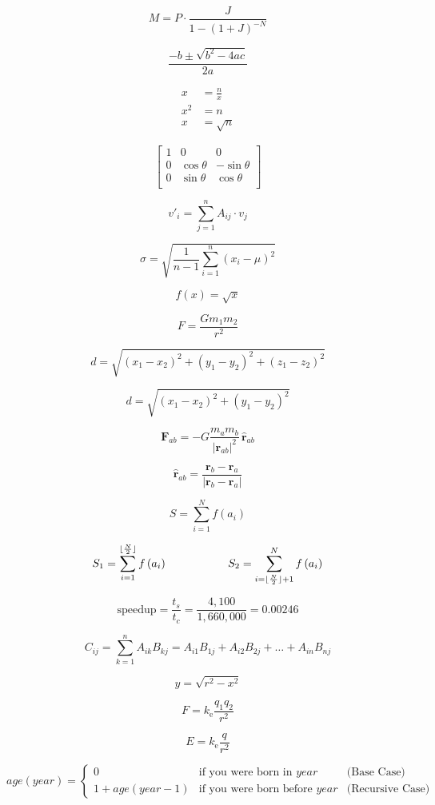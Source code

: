 \documentclass[12pt]{article}
\begin{document}
$$
M = P \cdot \frac{J}{1 - (1 + J)^{-N}}
$$

$$
\frac{-b \pm \sqrt{b^2 - 4ac}}{2a}
$$


\begin{align*}
x &= \frac{n}{x} \\
x^2 &= n \\
x &= \sqrt{n}
\end{align*}

$$
\begin{bmatrix}
1 & 0 & 0 \\
0 & \cos \theta & -\sin \theta \\
0 & \sin \theta  & \cos \theta \\
\end{bmatrix}
$$

$$
v'_i = \sum_{j = 1}^n A_{ij}\cdot v_j
$$

$$
\sigma = \sqrt{\frac{1}{n - 1}\sum_{i = 1}^n (x_i - \mu)^2}
$$

$$
f(x) = \sqrt{x}
$$

$$
F = \frac{Gm_1m_2}{r^2}
$$

$$
d = \sqrt{(x_1 - x_2)^2 + (y_1 - y_2)^2 + (z_1 -  z_2)^2}
$$

$$
d = \sqrt{(x_1 - x_2)^2+(y_1 - y_2)^2}
$$

$$
\mathbf{F}_{ab} = - G \frac{m_a m_b}{{\vert \mathbf{r}_{ab} \vert}^2} \, \mathbf{\hat{r}}_{ab}
$$

$$
\mathbf{\hat{r}}_{ab} = \frac{\mathbf{r}_b - \mathbf{r}_a}{\vert\mathbf{r}_b - \mathbf{r}_a\vert}
$$

$$
S = \sum_{i=1}^N f\left(a_i\right)
$$

$$
S_1 = \sum_{i=1}^{\lfloor \frac{N}{2}\rfloor } f\left(a_i\right)\hspace{.75in}
S_2 = \sum_{i=\lfloor \frac{N}{2} \rfloor +1}^{N} f\left(a_i\right)
$$

$$
\mbox{speedup}=\frac{t_s}{t_c} = \frac{4,100}{1,660,000} = 0.00246
$$

$$
C_{ij} = \sum_{k = 1}^n A_{ik}B_{kj} = A_{i1}B_{1j} + A_{i2}B_{2j} + \ldots + A_{in}B_{nj}
$$

$$
y = \sqrt{r^2 - x^2}
$$

$$
F = k_\mathrm{e} \frac{q_1q_2}{r^2}
$$

$$
E = k_\mathrm{e} \frac{q}{r^2}
$$

$$
age(year) =
\left\{\begin{array}{lll}
0 & \text{if you were born in $year$} &  \text{(Base Case)} \\
1 + age(year-1) & \text{if you were born before $year$} &  \text{(Recursive Case)}
\end{array}\right.
$$
\end{document}
